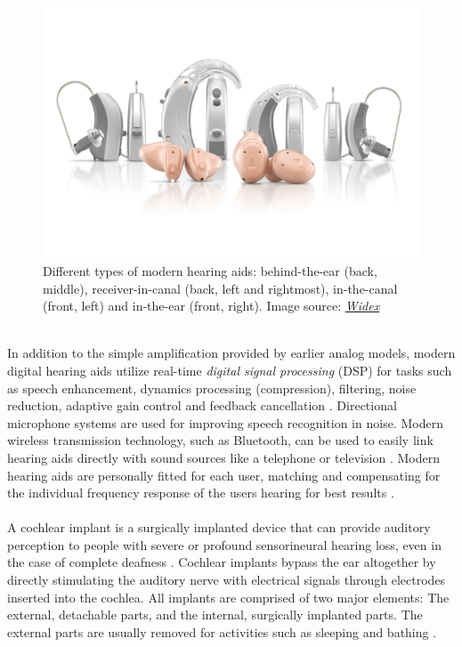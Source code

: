 \documentclass[english, 12pt, a4paper, pdftex, elec, utf8]{aaltothesis}
\begin{document}
\begin{figure}[h]
	\centering 
	\includegraphics[trim={0cm 4cm 0cm 4cm}, clip, width=\textwidth]{hearingaids.png} 	%
	\caption{Different types of modern hearing aids: behind-the-ear (back, middle), receiver-in-canal (back, left and rightmost), in-the-canal (front, left) and in-the-ear (front, right). Image source: \href{https://www.widex.pro/en/products/unique-hearing-aids}{\textit{Widex}}}
	\label{fig:hearingaids} 
\end{figure} \\
In addition to the simple amplification provided by earlier analog models, modern digital hearing aids utilize real-time \textit{digital signal processing} (DSP) for tasks such as speech enhancement, dynamics processing (compression), filtering, noise reduction, adaptive gain control and feedback cancellation \cite{moore2007cochlear, levitt2007historical, goehring2016speech}. Directional microphone systems are used for improving speech recognition in noise. Modern wireless transmission technology, such as Bluetooth, can be used to easily link hearing aids directly with sound sources like a telephone or television \cite{salonen2013hearing}. Modern hearing aids are personally fitted for each user, matching and compensating for the individual frequency response of the users hearing for best results \cite{moore2007cochlear}. \\\\
A cochlear implant is a surgically implanted device that can provide auditory perception to people with severe or profound sensorineural hearing loss, even in the case of complete deafness \cite{moore2007cochlear, peterson2010cochlear}. Cochlear implants bypass the ear altogether by directly stimulating the auditory nerve with electrical signals through electrodes inserted into the cochlea. All implants are comprised of two major elements: The external, detachable parts, and the internal, surgically implanted parts. The external parts are usually removed for activities such as sleeping and bathing \cite{peterson2010cochlear}. \\\\
\end{document}

